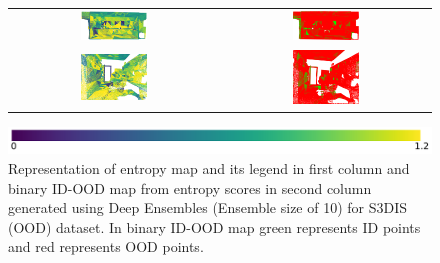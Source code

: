 \begin{figure}[h!]
\begin{tabular}{cc}
            \includegraphics[width=0.33\textwidth, height=0.18\textheight]{images/ood_imgs/de_s3dis/pnt_1_de_ent.pdf}& 
            \includegraphics[width=0.33\textwidth, height=0.18\textheight]{images/ood_imgs/de_s3dis/de_ent_3.pdf}\\

            \includegraphics[width=0.33\textwidth, height=0.18\textheight]{images/ood_imgs/de_s3dis/ofc_42_de_ent.pdf}& 
            \includegraphics[width=0.33\textwidth, height=0.18\textheight]{images/ood_imgs/de_s3dis/de_ent_1.pdf}\\
        \end{tabular}
        \includegraphics[scale=0.45]{images/ent_legend.pdf}
        \caption{Representation of entropy map and its legend in first column and binary ID-OOD map from entropy scores in second column generated using Deep Ensembles (Ensemble size of 10) for S3DIS (OOD) dataset. In binary ID-OOD map green represents ID points and red represents OOD points.}
        \label{fig:de_s3dis_oodmap_ent}
    \end{figure}
